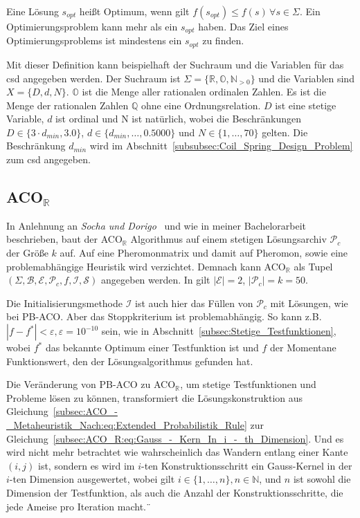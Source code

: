 \documentclass[fontsize=12, a4aper]{scrartcl}
\begin{document}
	Eine Lösung \(s_{opt}\) heißt Optimum, wenn gilt \(f(s_{opt}) \leq f(s) \, \forall s \in \Sigma\). Ein Optimierungsproblem kann mehr als ein \(s_{opt}\) haben. Das Ziel eines Optimierungsproblems ist mindestens ein \(s_{opt}\) zu finden.\hfill\newline
	
	Mit dieser Definition kann beispielhaft der Suchraum und die Variablen für das \acl{csd} angegeben werden. Der Suchraum ist \(\Sigma = \{\mathbb{R}, \mathbb{O}, \mathbb{N}_{>0}\}\) und die Variablen sind \(X = \{D, d, N\}\). \(\mathbb{O}\) ist die Menge aller rationalen ordinalen Zahlen. Es ist die Menge der rationalen Zahlen \(\mathbb{Q}\) ohne eine Ordnungsrelation. \(D\) ist eine stetige Variable, \(d\) ist ordinal und N ist natürlich, wobei die Beschränkungen \(D \in \{3 \cdot d_{min}, 3.0\}\), \(d \in \{d_{min}, \dots, 0.5000\}\) und \(N \in \{1, \dots, 70\}\) gelten. Die Beschränkung \(d_{min}\) wird im Abschnitt~\ref{subsubsec:Coil_Spring_Design_Problem} zum \ac{csd} angegeben.
	
	\subsection{ACO\(_{\mathbb{R}}\)} \label{subsec:ACO_R}
	
	In Anlehnung an \textit{Socha und Dorigo}~\cite{socha2008ant} und wie in meiner Bachelorarbeit~\cite{FCM_2019} beschrieben, baut der ACO\(_{\mathbb{R}}\) Algorithmus auf einem stetigen Lösungsarchiv \(\mathcal{P}_c\) der Größe \(k\) auf. Auf eine Pheromonmatrix und damit auf Pheromon, sowie eine problemabhängige Heuristik wird verzichtet. Demnach kann ACO\(_{\mathbb{R}}\) als Tupel \((\Sigma, \mathcal{B}, \mathcal{E}, \mathcal{P}_c, f, \mathcal{I}, \mathcal{S})\) angegeben werden. In \cite{socha2008ant} gilt \(|\mathcal{E}| = 2\), \(|\mathcal{P}_c| = k = 50\).\hfill\newline
	
	Die Initialisierungsmethode \(\mathcal{I}\) ist auch hier das Füllen von \(\mathcal{P}_c\) mit Lösungen, wie bei PB-ACO. Aber das Stoppkriterium ist problemabhängig. So kann z.B. \(|f - f^*| < \varepsilon, \varepsilon = 10^{-10}\) sein, wie in Abschnitt~\ref{subsec:Stetige_Testfunktionen}, wobei \(f^*\) das bekannte Optimum einer Testfunktion ist und \(f\) der Momentane Funktionswert, den der Lösungsalgorithmus gefunden hat.\hfill\newline
	
	Die Veränderung von PB-ACO zu ACO\(_{\mathbb{R}}\), um stetige Testfunktionen und Probleme lösen zu können, transformiert die Lösungskonstruktion aus Gleichung~\ref{subsec:ACO_-_Metaheuristik_Nach:eq:Extended_Probabilistik_Rule} zur Gleichung~\ref{subsec:ACO_R:eq:Gauss_-_Kern_In_i_-_th_Dimension}. Und es wird nicht mehr betrachtet wie wahrscheinlich das Wandern entlang einer Kante \((i,j)\) ist, sondern es wird im \(i\)-ten Konstruktionsschritt ein Gauss-Kernel in der \(i\)-ten Dimension ausgewertet, wobei gilt \(i \in \{1, \dots, n\}, n \in \mathbb{N}\), und \(n\) ist sowohl die Dimension der Testfunktion, als auch die Anzahl der Konstruktionsschritte, die jede Ameise pro Iteration macht.\hfill\newline¨
	
\end{document}
